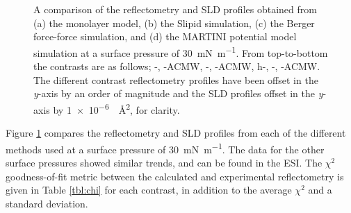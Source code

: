 \documentclass[amsmath,amssymb,twocolumn,superscriptaddress,aps,prl]{revtex4-1}
\begin{document}
\begin{figure}
 \caption{A comparison of the reflectometry and SLD profiles obtained from (a) the monolayer model, (b) the Slipid simulation, (c) the Berger force-force simulation, and (d) the MARTINI potential model simulation at a surface pressure of \SI{30}{\milli\newton\per\meter}. From top-to-bottom the contrasts are as follows; -, -ACMW, -, -ACMW, h-, -, -ACMW. The different contrast reflectometry profiles have been offset in the \emph{y}-axis by an order of magnitude and the SLD profiles offset in the \emph{y}-axis by \SI{1e-6}{\per\square\angstrom}, for clarity.}
 \label{fig:ref}
\end{figure}
%
Figure \ref{fig:ref} compares the reflectometry and SLD profiles from each of the different methods used at a surface pressure of \SI{30}{\milli\newton\per\meter}.
The data for the other surface pressures showed similar trends, and can be found in the ESI.
The $\chi^2$ goodness-of-fit metric between the calculated and experimental reflectometry is given in Table \ref{tbl:chi} for each contrast, in addition to the average $\chi^2$ and a standard deviation.
%
\end{document}
